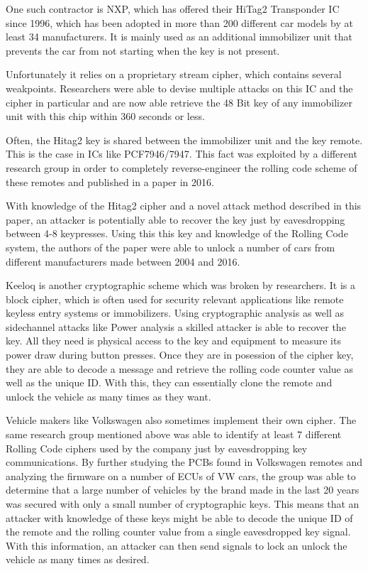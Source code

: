 \begin{itemize}
One such contractor is NXP, which has offered their HiTag2 Transponder IC since 1996, which has been adopted in more than 200 different car models by at least 34 manufacturers. It is mainly used as an additional immobilizer unit that prevents the car from not starting when the key is not present.

Unfortunately it relies on a proprietary stream cipher, which contains several weakpoints. Researchers were able to devise multiple attacks on this IC and the cipher in particular and are now able retrieve the 48 Bit key of any immobilizer unit with this chip within 360 seconds or less.
\cite{verdult2012gone}

Often, the Hitag2 key is shared between the immobilizer unit and the key remote. This is the case in ICs like PCF7946/7947. This fact was exploited by a different research group in order to completely reverse-engineer the rolling code scheme of these remotes and published in a paper in 2016.

With knowledge of the Hitag2 cipher and a novel attack method described in this paper, an attacker is potentially able to recover the key just by eavesdropping between 4-8 keypresses. Using this this key and knowledge of the Rolling Code system, the authors of the paper were able to unlock a number of cars from different manufacturers made between 2004 and 2016.\cite{garcia2016lock}

Keeloq is another cryptographic scheme which was broken by researchers. It is a block cipher, which is often used for security relevant applications like remote keyless entry systems or immobilizers.
Using cryptographic analysis as well as sidechannel attacks like Power analysis a skilled attacker is able to recover the key. All they need is physical access to the key and equipment to measure its power draw during button presses. Once they are in posession of the cipher key, they are able to decode a message and retrieve the rolling code counter value as well as the unique ID. With this, they can essentially clone the remote and unlock the vehicle as many times as they want. %

Vehicle makers like Volkswagen also sometimes implement their own cipher. The same research group mentioned above was able to identify at least 7 different Rolling Code ciphers used by the company just by eavesdropping key communications. By further studying the PCBs found in Volkswagen remotes and analyzing the firmware on a number of ECUs of VW cars, the group was able to determine that a large number of vehicles by the brand made in the last 20 years was secured with only a small number of cryptographic keys. This means that an attacker with knowledge of these keys might be able to decode the unique ID of the remote and the rolling counter value from a single eavesdropped key signal. With this information, an attacker can then send signals to lock an unlock the vehicle as many times as desired.\cite{garcia2016lock}


\end{itemize}
